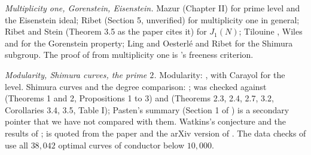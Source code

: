\emph{Multiplicity one, Gorenstein, Eisenstein.} Mazur \cite{Mazur77} (Chapter II) for prime level and the Eisenstein ideal; Ribet \cite{Ribet90} (Section 5, unverified) for multiplicity one in general;
Ribet and Stein \cite{RibetStein} (Theorem 3.5 as the paper cites it) for $J_1(N)$; Tilouine \cite{Tilouine97}, Wiles \cite[Chapter 2]{Wiles95} and \cite[Section 4]{DDT} for the Gorenstein property; Ling and Oesterl\'e
\cite{LingOesterle} and Ribet \cite{Ribet88} for the Shimura subgroup. The proof of  from multiplicity one is 's freeness criterion.

\emph{Modularity, Shimura curves, the prime $2$.} Modularity: \cite{Wiles95,TaylorWiles,BCDT}, with Carayol \cite{Carayol86} for the level. Shimura curves and the degree comparison: \cite{Ribet90,RibetTakahashi97,Takahashi01,Pasten};  was checked against \cite{RibetTakahashi97} (Theorems 1 and 2, Propositions 1 to 3) and \cite{Takahashi01}
(Theorems 2.3, 2.4, 2.7, 3.2, Corollaries 3.4, 3.5, Table I); Pasten's summary (Section 1 of \cite{Pasten}) is a secondary pointer that we have not compared with them. Watkins's conjecture \cite{Watkins02} and the results of \cite{Dummigan06,CalegariEmerton09,Yazdani11,CaroPasten22,HatleyKundu,BKP};  is quoted from the paper and the arXiv version of \cite{CalegariEmerton09}. The data checks of
 use all $38{,}042$ optimal curves of conductor below $10{,}000$.
